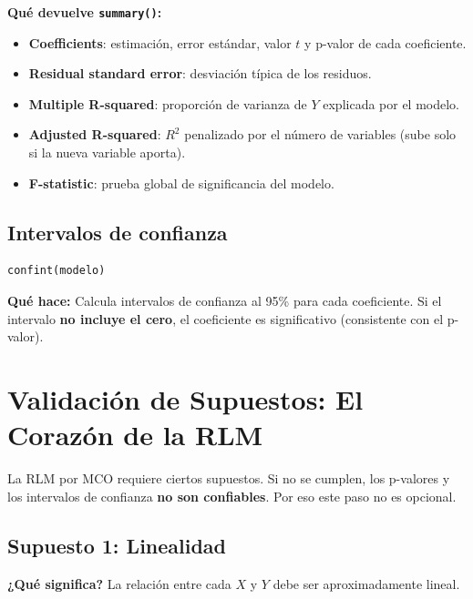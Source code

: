 \documentclass[12pt,a4paper]{article}
\begin{document}
\textbf{Qué devuelve \texttt{summary()}:}
\begin{itemize}
    \item \textbf{Coefficients}: estimación, error estándar, valor $t$ y p-valor de cada coeficiente.
    \item \textbf{Residual standard error}: desviación típica de los residuos.
    \item \textbf{Multiple R-squared}: proporción de varianza de $Y$ explicada por el modelo.
    \item \textbf{Adjusted R-squared}: $R^2$ penalizado por el número de variables (sube solo si la nueva variable aporta).
    \item \textbf{F-statistic}: prueba global de significancia del modelo.
\end{itemize}

\subsection{Intervalos de confianza}

\begin{lstlisting}
confint(modelo)
\end{lstlisting}

\textbf{Qué hace:} Calcula intervalos de confianza al 95\% para cada coeficiente. Si el intervalo \textbf{no incluye el cero}, el coeficiente es significativo (consistente con el p-valor).

\section{Validación de Supuestos: El Corazón de la RLM}

La RLM por MCO requiere ciertos supuestos. Si no se cumplen, los p-valores y los intervalos de confianza \textbf{no son confiables}. Por eso este paso no es opcional.

\subsection{Supuesto 1: Linealidad}

\textbf{¿Qué significa?} La relación entre cada $X$ y $Y$ debe ser aproximadamente lineal.
\end{document}
